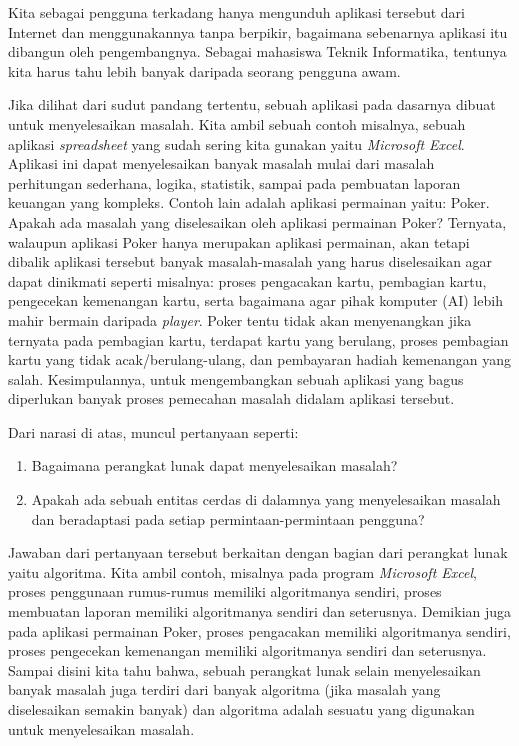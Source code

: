 Kita sebagai pengguna terkadang hanya mengunduh aplikasi tersebut dari Internet dan menggunakannya tanpa berpikir, bagaimana sebenarnya aplikasi itu dibangun oleh pengembangnya. Sebagai mahasiswa Teknik Informatika, tentunya kita harus tahu lebih banyak daripada seorang pengguna awam. 

Jika dilihat dari sudut pandang tertentu, sebuah aplikasi pada dasarnya dibuat untuk menyelesaikan masalah. Kita ambil sebuah contoh misalnya, sebuah aplikasi \textit{spreadsheet} yang sudah sering kita gunakan yaitu \textit{Microsoft Excel}. Aplikasi ini dapat menyelesaikan banyak masalah mulai dari masalah perhitungan sederhana, logika, statistik, sampai pada pembuatan laporan keuangan yang kompleks. Contoh lain adalah aplikasi permainan yaitu: Poker. Apakah ada masalah yang diselesaikan oleh aplikasi permainan Poker? Ternyata, walaupun aplikasi Poker hanya merupakan aplikasi permainan, akan tetapi dibalik aplikasi tersebut banyak masalah-masalah yang harus diselesaikan agar dapat dinikmati seperti misalnya: proses pengacakan kartu, pembagian kartu, pengecekan kemenangan kartu, serta bagaimana agar pihak komputer (AI) lebih mahir bermain daripada \textit{player}. Poker tentu tidak akan menyenangkan jika ternyata pada pembagian kartu, terdapat kartu yang berulang, proses pembagian kartu yang tidak acak/berulang-ulang, dan pembayaran hadiah kemenangan yang salah. Kesimpulannya, untuk mengembangkan sebuah aplikasi yang bagus diperlukan banyak proses pemecahan masalah didalam aplikasi tersebut.

Dari narasi di atas, muncul pertanyaan seperti:
\begin{enumerate}
	\item Bagaimana perangkat lunak dapat menyelesaikan masalah?
	\item Apakah ada sebuah entitas cerdas di dalamnya yang menyelesaikan masalah dan beradaptasi pada setiap permintaan-permintaan pengguna?
\end{enumerate}
  
Jawaban dari pertanyaan tersebut berkaitan dengan bagian dari perangkat lunak yaitu algoritma. Kita ambil contoh, misalnya pada program \textit{Microsoft Excel}, proses penggunaan rumus-rumus memiliki algoritmanya sendiri, proses membuatan laporan memiliki algoritmanya sendiri dan seterusnya. Demikian juga pada aplikasi permainan Poker, proses pengacakan memiliki algoritmanya sendiri, proses pengecekan kemenangan memiliki algoritmanya sendiri dan seterusnya. Sampai disini kita tahu bahwa, sebuah perangkat lunak selain menyelesaikan banyak masalah juga terdiri dari banyak algoritma (jika masalah yang diselesaikan semakin banyak) dan algoritma adalah sesuatu yang digunakan untuk menyelesaikan masalah.



